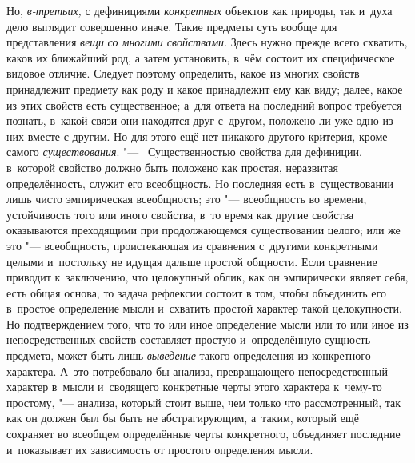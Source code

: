Но, {\em в-третьих,}
с дефинициями
{\em конкретных} объектов
как природы, так и~духа дело выглядит совершенно иначе. Такие предметы суть
вообще для представления {\em вещи}
{\em со многими свойствами}.
Здесь нужно прежде всего схватить, каков их ближайший род, а
затем установить, в~чём состоит их специфическое видовое отличие. Следует
поэтому определить, какое из многих свойств принадлежит предмету как роду и
какое принадлежит ему как виду; далее, какое из этих свойств есть
существенное; а~для ответа на последний вопрос требуется познать, в~какой
связи они находятся друг с~другом, положено ли уже одно из них вместе с
другим. Но для этого ещё нет никакого другого критерия, кроме самого
{\em существования}. "---
~Существенностью свойства для дефиниции, в~которой свойство
должно быть положено как простая, неразвитая определённость, служит его
всеобщность. Но последняя есть в~существовании лишь чисто эмпирическая
всеобщность; это "--- всеобщность во времени, устойчивость того
или иного свойства, в~то время как другие свойства оказываются преходящими
при продолжающемся существовании целого; или же это
"--- всеобщность, проистекающая из сравнения с~другими
конкретными целыми и~постольку не идущая дальше простой общности. Если
сравнение приводит к~заключению, что целокупный облик, как
он эмпирически являет себя, есть общая основа, то задача рефлексии состоит
в том, чтобы объединить его в~простое определение мысли и~схватить простой
характер такой целокупности. Но подтверждением того, что то или иное
определение мысли или то или иное из непосредственных свойств составляет
простую и~определённую сущность предмета, может быть лишь
{\em выведение} такого
определения из конкретного характера. А~это потребовало бы анализа,
превращающего непосредственный характер в~мысли и~сводящего конкретные
черты этого характера к~чему-то простому, "--- анализа, который
стоит выше, чем только что рассмотренный, так как он должен был бы быть не
абстрагирующим, а~таким, который ещё сохраняет во всеобщем определённые
черты конкретного, объединяет последние и~показывает их зависимость от
простого определения мысли.

